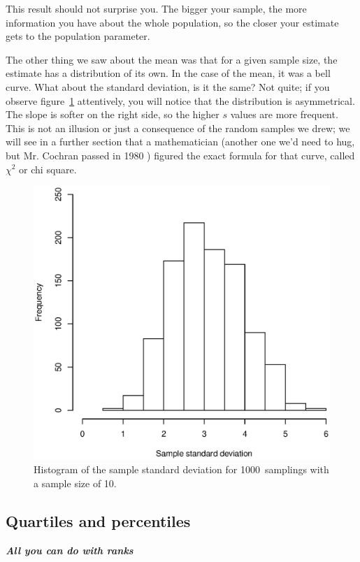 \documentclass{report}
\newcommand{\notefor}[1]{\hfill\textbf{\textit{#1}}}
\begin{document}
			This result should not surprise you. The bigger your sample, the more information you have about the whole population, so the closer your estimate gets to the population parameter.
			
			The other thing we saw about the mean was that for a given sample size, the estimate has a distribution of its own. In the case of the mean, it was a bell curve. What about the standard deviation, is it the same? Not quite; if you observe figure~\ref{fig:sd_distr} attentively, you will notice that the distribution is asymmetrical. The slope is softer on the right side, so the higher $s$ values are more frequent. This is not an illusion or just a consequence of the random samples we drew; we will see in a further section that a mathematician (another one we'd need to hug, but Mr. Cochran passed in 1980 \cite{cochran}) figured the exact formula for that curve, called $\chi^2$ or chi square.
			
			\begin{figure}[h]
				\centering
				\includegraphics[width=1.0\textwidth]{sd_distr.eps}
				\caption{Histogram of the sample standard deviation for 1000~samplings with a sample size of 10.}
				\label{fig:sd_distr}
			\end{figure}
		
		\subsection{Quartiles and percentiles}
		\notefor{All you can do with ranks}
		
\end{document}
